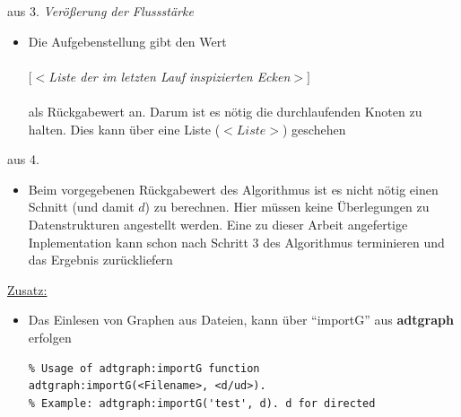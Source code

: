 \documentclass[11pt]{article}
\begin{document}
    aus 3. \textit{Ver\"o\ss{}erung der Flussst\"arke}
    \begin{itemize}
        \item Die Aufgebenstellung gibt den Wert\\~\\ $[<$\textit{Liste der im letzten Lauf inspizierten Ecken}$>]$\\~\\ als R\"uckgabewert an. Darum ist es n\"otig die durchlaufenden Knoten zu halten. Dies kann \"uber eine Liste ($<Liste>$) geschehen
    \end{itemize}
    aus 4.
    \begin{itemize}
        \item Beim vorgegebenen R\"uckgabewert des Algorithmus ist es nicht n\"otig einen Schnitt (und damit $d$) zu berechnen. Hier m\"ussen keine \"Uberlegungen zu Datenstrukturen angestellt werden. Eine zu dieser Arbeit angefertige Inplementation kann schon nach Schritt 3 des Algorithmus terminieren und das Ergebnis zur\"uckliefern
    \end{itemize}
    \underline{Zusatz:}
    \begin{itemize}
        \item Das Einlesen von Graphen aus Dateien, kann \"uber "`importG"' aus \textbf{adtgraph} erfolgen
\begin{lstlisting}
% Usage of adtgraph:importG function
adtgraph:importG(<Filename>, <d/ud>).
% Example: adtgraph:importG('test', d). d for directed
\end{lstlisting}
    \end{itemize}
\end{document}
